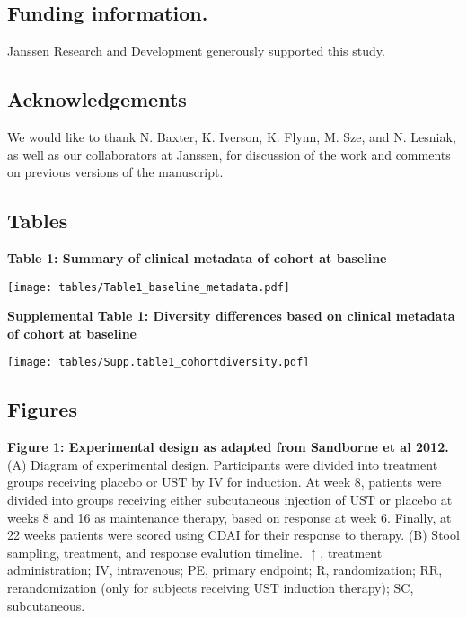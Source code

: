 \documentclass[12pt,]{article}
\begin{document}
\subsection{Funding information.}\label{funding-information.}

Janssen Research and Development generously supported this study.

\subsection{Acknowledgements}\label{acknowledgements}

We would like to thank N. Baxter, K. Iverson, K. Flynn, M. Sze, and N.
Lesniak, as well as our collaborators at Janssen, for discussion of the
work and comments on previous versions of the manuscript.

\newpage

\subsection{Tables}\label{tables}

\textbf{Table 1: Summary of clinical metadata of cohort at baseline}

\texttt{[image: tables/Table1\_baseline\_metadata.pdf]}

\newpage

\textbf{Supplemental Table 1: Diversity differences based on clinical
metadata of cohort at baseline}

\texttt{[image: tables/Supp.table1\_cohortdiversity.pdf]}

\newpage

\subsection{Figures}\label{figures}

\textbf{Figure 1: Experimental design as adapted from Sandborne et al
2012.} (A) Diagram of experimental design. Participants were divided
into treatment groups receiving placebo or UST by IV for induction. At
week 8, patients were divided into groups receiving either subcutaneous
injection of UST or placebo at weeks 8 and 16 as maintenance therapy,
based on response at week 6. Finally, at 22 weeks patients were scored
using CDAI for their response to therapy. (B) Stool sampling, treatment,
and response evalution timeline. \(\uparrow\), treatment administration;
IV, intravenous; PE, primary endpoint; R, randomization; RR,
rerandomization (only for subjects receiving UST induction therapy); SC,
subcutaneous.
\end{document}
